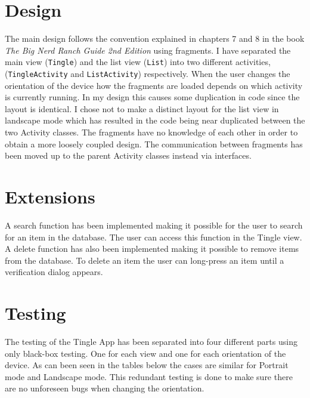 \section{Design}
The main design follows the convention explained in chapters 7 and 8 in the book \emph{The Big Nerd Ranch Guide 2nd Edition} using fragments.
I have separated the main view (\texttt{Tingle}) and the list view (\texttt{List}) into two different 
activities, (\texttt{TingleActivity} and \texttt{ListActivity}) respectively. When the user changes the orientation of the device how the fragments are loaded depends on which activity is
currently running. In my design this causes some duplication in code since the layout is identical. I chose 
not to make a distinct layout for the list view in landscape mode which has resulted in the code being near duplicated between the two Activity classes.
The fragments have no knowledge of each other in order to obtain a more loosely coupled design.
The communication between fragments has been moved up to the parent Activity classes instead via interfaces.

\section{Extensions }
A search function has been implemented making it possible for the user to search for an item in 
the database. The user can access this function in the Tingle view.
A delete function has also been implemented making it possible to remove items from the database. To delete an item the user can long-press an item until a verification dialog appears.

\section{Testing}
The testing of the Tingle App has been separated into four different parts using only black-box testing. One for each view and one for each orientation of the device. As can been seen in the tables below the cases are similar for Portrait mode and Landscape mode. This redundant testing is done to make sure there are no unforeseen bugs when changing the orientation.


